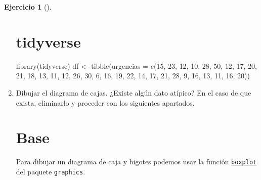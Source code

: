 \documentclass[
  spanish,
  a4paper,
]{scrreport}
\newenvironment{Shaded}{\begin{snugshade}}{\end{snugshade}}
\newcommand{\AttributeTok}[1]{\textcolor[rgb]{0.40,0.45,0.13}{#1}}
\newcommand{\DecValTok}[1]{\textcolor[rgb]{0.68,0.00,0.00}{#1}}
\newcommand{\FunctionTok}[1]{\textcolor[rgb]{0.28,0.35,0.67}{#1}}
\newcommand{\NormalTok}[1]{\textcolor[rgb]{0.00,0.23,0.31}{#1}}
\newcommand{\OtherTok}[1]{\textcolor[rgb]{0.00,0.23,0.31}{#1}}
\theoremstyle{definition}
\newtheorem{exercise}{Ejercicio}[chapter]
\theoremstyle{remark}
\begin{document}
\begin{exercise}[]
\begin{enumerate}
\begin{tcolorbox}
  \section{tidyverse}

\begin{Shaded}
\begin{Highlighting}[]
\FunctionTok{library}\NormalTok{(tidyverse)}
\NormalTok{df }\OtherTok{\textless{}{-}} \FunctionTok{tibble}\NormalTok{(}\AttributeTok{urgencias =} \FunctionTok{c}\NormalTok{(}\DecValTok{15}\NormalTok{, }\DecValTok{23}\NormalTok{, }\DecValTok{12}\NormalTok{, }\DecValTok{10}\NormalTok{, }\DecValTok{28}\NormalTok{, }\DecValTok{50}\NormalTok{, }\DecValTok{12}\NormalTok{, }\DecValTok{17}\NormalTok{, }\DecValTok{20}\NormalTok{, }\DecValTok{21}\NormalTok{, }\DecValTok{18}\NormalTok{, }\DecValTok{13}\NormalTok{, }\DecValTok{11}\NormalTok{, }\DecValTok{12}\NormalTok{, }\DecValTok{26}\NormalTok{, }\DecValTok{30}\NormalTok{, }\DecValTok{6}\NormalTok{, }\DecValTok{16}\NormalTok{, }\DecValTok{19}\NormalTok{, }\DecValTok{22}\NormalTok{, }\DecValTok{14}\NormalTok{, }\DecValTok{17}\NormalTok{, }\DecValTok{21}\NormalTok{, }\DecValTok{28}\NormalTok{, }\DecValTok{9}\NormalTok{, }\DecValTok{16}\NormalTok{, }\DecValTok{13}\NormalTok{, }\DecValTok{11}\NormalTok{, }\DecValTok{16}\NormalTok{, }\DecValTok{20}\NormalTok{))}
\end{Highlighting}
\end{Shaded}

  \end{tcolorbox}
\item
  Dibujar el diagrama de cajas. ¿Existe algún dato atípico? En el caso
  de que exista, eliminarlo y proceder con los siguientes apartados.

  \begin{tcolorbox}[enhanced jigsaw, colback=white, coltitle=black, toprule=.15mm, rightrule=.15mm, opacitybacktitle=0.6, opacityback=0, bottomtitle=1mm, toptitle=1mm, titlerule=0mm, breakable, leftrule=.75mm, title=\textcolor{quarto-callout-tip-color}{\faLightbulb}\hspace{0.5em}{Solución}, arc=.35mm, left=2mm, bottomrule=.15mm, colframe=quarto-callout-tip-color-frame, colbacktitle=quarto-callout-tip-color!10!white]

  \section{Base}

  Para dibujar un diagrama de caja y bigotes podemos usar la función
  \href{https://www.rdocumentation.org/packages/graphics/versions/3.6.2/topics/boxplot}{\texttt{boxplot}}
  del paquete \texttt{graphics}.


\end{tcolorbox}
\end{enumerate}
\end{exercise}
\end{document}
